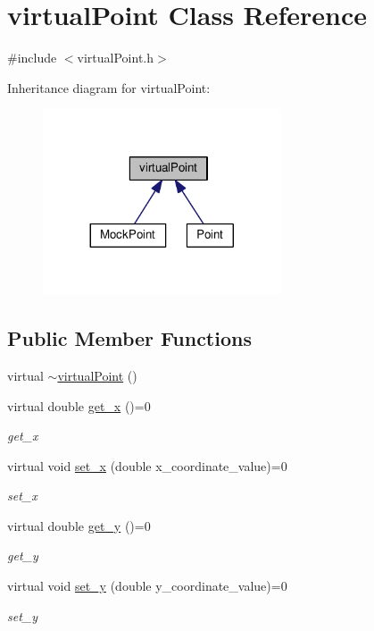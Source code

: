 \hypertarget{classvirtualPoint}{}\section{virtual\+Point Class Reference}
\label{classvirtualPoint}


{\ttfamily \#include $<$virtual\+Point.\+h$>$}



Inheritance diagram for virtual\+Point\+:
\nopagebreak
\begin{figure}[H]
\begin{center}
\leavevmode
\includegraphics[width=200pt]{classvirtualPoint__inherit__graph}
\end{center}
\end{figure}
\subsection*{Public Member Functions}
\begin{DoxyCompactItemize}
\item 
virtual \hyperlink{classvirtualPoint_a4f78d9a654861eb4bec3c9acd4b00c24}{$\sim$virtual\+Point} ()
\item 
virtual double \hyperlink{classvirtualPoint_afe6be96f2ab063515a78087d9ce22ddf}{get\+\_\+x} ()=0
\begin{DoxyCompactList}\small\item\em get\+\_\+x \end{DoxyCompactList}\item 
virtual void \hyperlink{classvirtualPoint_a2e0023f0dffbb82aee6d358a3998807d}{set\+\_\+x} (double x\+\_\+coordinate\+\_\+value)=0
\begin{DoxyCompactList}\small\item\em set\+\_\+x \end{DoxyCompactList}\item 
virtual double \hyperlink{classvirtualPoint_ab7149e207c73c324a5028c160d493ac4}{get\+\_\+y} ()=0
\begin{DoxyCompactList}\small\item\em get\+\_\+y \end{DoxyCompactList}\item 
virtual void \hyperlink{classvirtualPoint_afbeef257f2fe3581b6f302e085968f79}{set\+\_\+y} (double y\+\_\+coordinate\+\_\+value)=0
\begin{DoxyCompactList}\small\item\em set\+\_\+y \end{DoxyCompactList}\end{DoxyCompactItemize}


